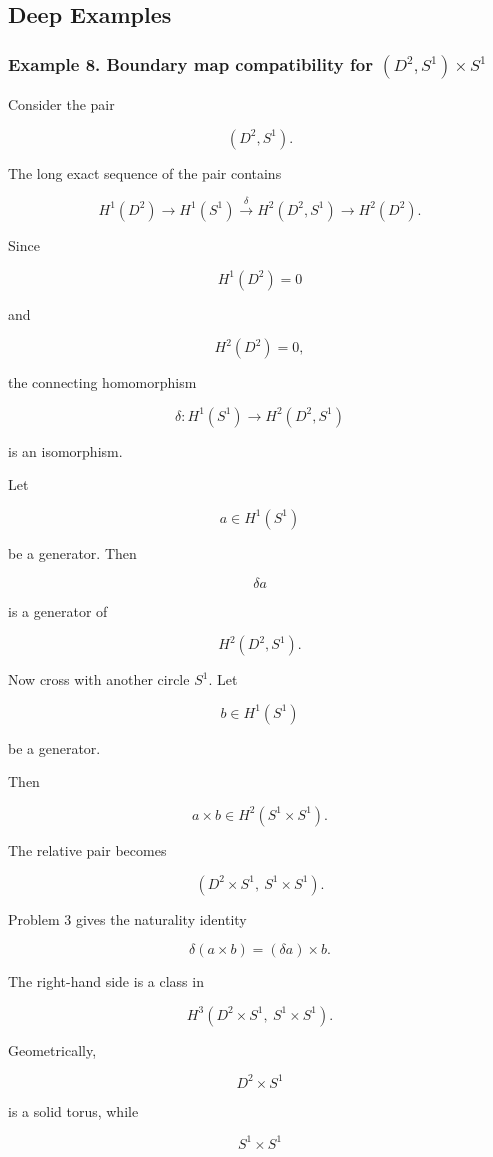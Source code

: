 \documentclass[12pt,a4paper]{article}
\theoremstyle{notespace}
\begin{document}
\subsection{Deep Examples}

\subsubsection{Example 8. Boundary map compatibility for \((D^2,S^1)\times S^1\)}

Consider the pair

\[
(D^2,S^1).
\]

The long exact sequence of the pair contains

\[
H^1(D^2)
\longrightarrow
H^1(S^1)
\xrightarrow{\delta}
H^2(D^2,S^1)
\longrightarrow
H^2(D^2).
\]

Since

\[
H^1(D^2)=0
\]

and

\[
H^2(D^2)=0,
\]

the connecting homomorphism

\[
\delta:H^1(S^1)\to H^2(D^2,S^1)
\]

is an isomorphism.

Let

\[
a\in H^1(S^1)
\]

be a generator. Then

\[
\delta a
\]

is a generator of

\[
H^2(D^2,S^1).
\]

Now cross with another circle \(S^1\). Let

\[
b\in H^1(S^1)
\]

be a generator.

Then

\[
a\times b\in H^2(S^1\times S^1).
\]

The relative pair becomes

\[
(D^2\times S^1,\ S^1\times S^1).
\]

Problem 3 gives the naturality identity

\[
\delta(a\times b)
=
(\delta a)\times b.
\]

The right-hand side is a class in

\[
H^3(D^2\times S^1,\ S^1\times S^1).
\]

Geometrically,

\[
D^2\times S^1
\]

is a solid torus, while

\[
S^1\times S^1
\]
\end{document}
